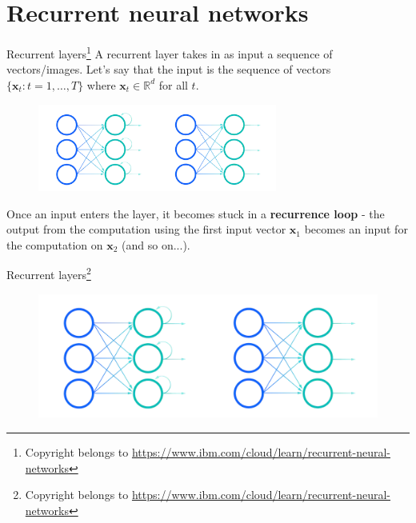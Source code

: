 \documentclass{beamer}
\begin{document}
\section{Recurrent neural networks}

\begin{frame}{Recurrent layers\footnote{Copyright belongs to \url{https://www.ibm.com/cloud/learn/recurrent-neural-networks}}}
A recurrent layer takes in as input a sequence of vectors/images. Let's say that the input is the sequence of vectors $\{\mathbf{x}_t:t=1,\dots,T\}$ where $\mathbf{x}_t\in\mathbb{R}^d$ for all $t$.

\begin{figure}
\centering
\includegraphics[width=0.7\textwidth]{Images/rnn.png}
\end{figure}
Once an input enters the layer, it becomes stuck in a \textbf{recurrence loop} - the output from the computation using the first input vector $\mathbf{x}_1$ becomes an input for the computation on $\mathbf{x}_2$ (and so on...).
\end{frame}
\begin{frame}{Recurrent layers\footnote{Copyright belongs to \url{https://www.ibm.com/cloud/learn/recurrent-neural-networks}}}
\begin{figure}
\centering
\includegraphics[width=\textwidth]{Images/rnn.png}
\end{figure}

\end{frame}
\end{document}
